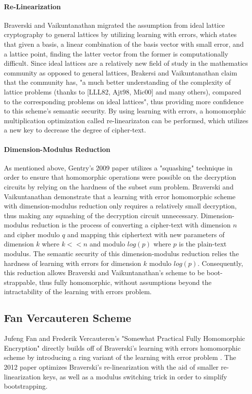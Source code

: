 \documentclass[10pt, a4paper]{article}
\begin{document}
	\paragraph{Re-Linearization}
	Braverski and Vaikuntanathan migrated the assumption from ideal lattice cryptography to general lattices by utilizing learning with errors, which states that given a basis, a linear combination of the basis vector with small error, and a lattice point, finding the latter vector from the former is computationally difficult. Since ideal lattices are a relatively new field of study in the mathematics community as opposed to general lattices, Brakersi and Vaikuntanathan claim that the community has, "a much better understanding of the complexity of lattice problems (thanks to [LLL82, Ajt98, Mic00] and many others), compared to the corresponding problems on ideal lattices"\cite{brakerski2014efficient}, thus providing more confidence to this scheme's semantic security. By using learning with errors, a homomorphic multiplication optimization called re-linearizaton can be performed, which utilizes a new key to decrease the degree of cipher-text.
	\paragraph{Dimension-Modulus Reduction}
	As mentioned above, Gentry's 2009 paper utilizes a "squashing" technique in order to ensure that homomorphic operations were possible on the decryption circuits by relying on the hardness of the subset sum problem. Braverski and Vaikuntanathan demonstrate that a learning with error homomorphic scheme with dimension-modulus reduction only requires a relatively small decryption, thus making any squashing of the decryption circuit unnecessary. Dimension-modulus reduction is the process of converting a cipher-text with dimension $n$ and cipher modulo $q$ and mapping this ciphertext with new parameters of dimension $k$ where $k << n$ and modulo $log(p)$ where $p$ is the plain-text modulus. The semantic security of this dimension-modulus reduction relies the hardness of learning with errors for dimension $k$ modulo $log(p)$. Consequently, this reduction allows Braverski and Vaikuntanathan's scheme to be boot-strappable, thus fully homomorphic, without assumptions beyond the intractability of the learning with errors problem.
	\subsection{Fan Vercauteren Scheme}
	Jufeng Fan and Frederik Vercauteren's "Somewhat Practical Fully Homomorphic Encryption" directly builds off of Braverski's learning with errors homomorphic scheme by introducing a ring variant of the learning with error problem \cite{fan2012somewhat}. The 2012 paper optimizes Braverski's re-linearization with the aid of smaller re-linearization keys, as well as a modulus switching trick in order to simplify bootstrapping. 
	
\end{document}
